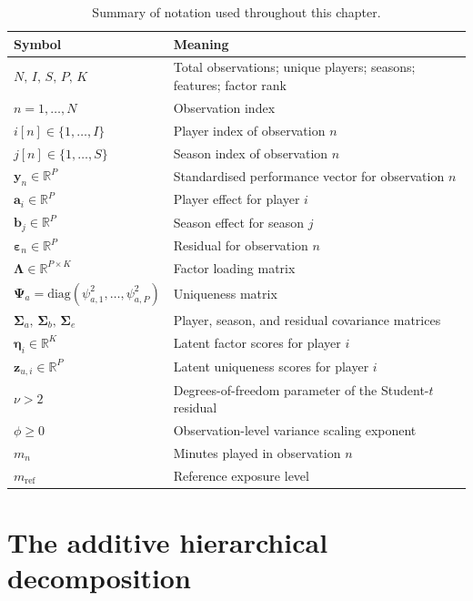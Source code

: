 \begin{table}[h]
\centering
\caption{Summary of notation used throughout this chapter.}
\label{tab:notation_model}
\begin{tabularx}{\textwidth}{lX}
\toprule
Symbol & Meaning \\
\midrule
$N,\, I,\, S,\, P,\, K$ & Total observations; unique players; seasons; features; factor rank \\
$n = 1,\ldots,N$ & Observation index \\
$i[n] \in \{1,\ldots,I\}$ & Player index of observation $n$ \\
$j[n] \in \{1,\ldots,S\}$ & Season index of observation $n$ \\
$\mathbf{y}_n \in \mathbb{R}^P$ & Standardised performance vector for observation $n$ \\
$\mathbf{a}_i \in \mathbb{R}^P$ & Player effect for player $i$ \\
$\mathbf{b}_j \in \mathbb{R}^P$ & Season effect for season $j$ \\
$\boldsymbol{\varepsilon}_n \in \mathbb{R}^P$ & Residual for observation $n$ \\
$\boldsymbol{\Lambda} \in \mathbb{R}^{P \times K}$ & Factor loading matrix \\
$\boldsymbol{\Psi}_a = \mathrm{diag}(\psi_{a,1}^2, \ldots, \psi_{a,P}^2)$ & Uniqueness matrix \\
$\boldsymbol{\Sigma}_a,\, \boldsymbol{\Sigma}_b,\, \boldsymbol{\Sigma}_e$ & Player, season, and residual covariance matrices \\
$\boldsymbol{\eta}_i \in \mathbb{R}^K$ & Latent factor scores for player $i$ \\
$\mathbf{z}_{u,i} \in \mathbb{R}^P$ & Latent uniqueness scores for player $i$ \\
$\nu > 2$ & Degrees-of-freedom parameter of the Student-$t$ residual \\
$\phi \geq 0$ & Observation-level variance scaling exponent \\
$m_n$ & Minutes played in observation $n$ \\
$m_{\mathrm{ref}}$ & Reference exposure level \\
\bottomrule
\end{tabularx}
\end{table}

\section{The additive hierarchical decomposition}

